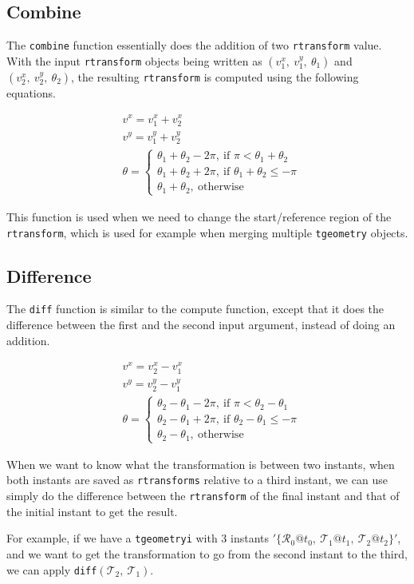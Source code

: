 \subsection{Combine}
\label{section:combine}

The \lstinline{combine} function essentially does the addition of two \lstinline{rtransform} value. With the input \lstinline{rtransform} objects being written as $(v_1^x,\ v_1^y,\ \theta_1)$ and $(v_2^x,\ v_2^y,\ \theta_2)$, the resulting \lstinline{rtransform} is computed using the following equations.

\begin{align*}
        & v^x = v_1^x + v_2^x \\
        & v^y = v_1^y + v_2^y \\
        & \theta = 
        \begin{cases}
            \theta_1 + \theta_2 - 2\pi,\ \text{if } \pi < \theta_1 + \theta_2 \\
            \theta_1 + \theta_2 + 2\pi,\ \text{if } \theta_1 + \theta_2 \le -\pi \\
            \theta_1 + \theta_2,\ \text{otherwise}
        \end{cases}
\end{align*}

This function is used when we need to change the start/reference region of the \lstinline{rtransform}, which is used for example when merging multiple \lstinline{tgeometry} objects.

\subsection{Difference}
\label{section:diff}

The \lstinline{diff} function is similar to the compute function, except that it does the difference between the first and the second input argument, instead of doing an addition.

\begin{align*}
        & v^x = v_2^x - v_1^x \\
        & v^y = v_2^y - v_1^y \\
        & \theta = 
        \begin{cases}
            \theta_2 - \theta_1 - 2\pi,\ \text{if } \pi < \theta_2 - \theta_1 \\
            \theta_2 - \theta_1 + 2\pi,\ \text{if } \theta_2 - \theta_1 \le -\pi \\
            \theta_2 - \theta_1,\ \text{otherwise}
        \end{cases}
\end{align*}

When we want to know what the transformation is between two instants, when both instants are saved as \lstinline{rtransforms} relative to a third instant, we can use simply do the difference between the \lstinline{rtransform} of the final instant and that of the initial instant to get the result.

For example, if we have a \lstinline{tgeometryi} with 3 instants $'\{\mathcal{R}_0@t_0,\ \mathcal{T}_1@t_1,\ \mathcal{T}_2@t_2\}'$, and we want to get the transformation to go from the second instant to the third, we can apply \lstinline{diff}$(\mathcal{T}_2,\ \mathcal{T}_1)$.